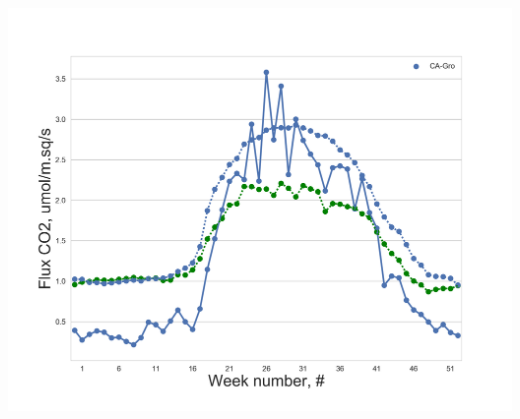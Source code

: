 \documentclass{beamer}
\begin{document}
\begin{frame}
\begin{columns}[t]
\includegraphics[width=\textwidth]{Reverse_engin/0.png}
\end{columns}

\end{frame}
\end{document}
